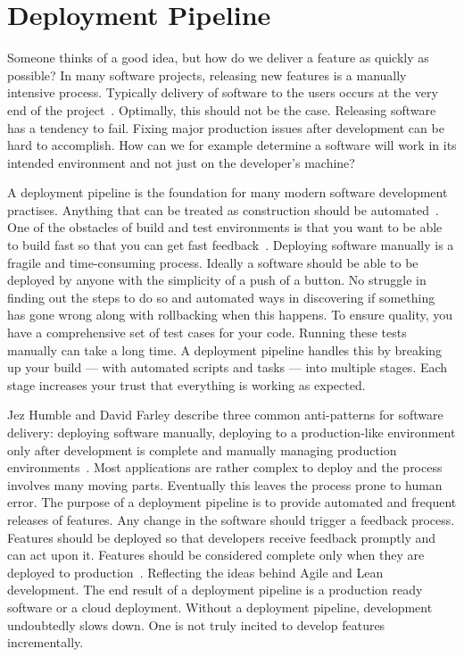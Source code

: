 \documentclass[english]{tktltiki2}
\begin{document}
\section{Deployment Pipeline}

Someone thinks of a good idea, but how do we deliver a feature as quickly as possible? In many software projects, releasing new features is a manually intensive process. Typically delivery of software to the users occurs at the very end of the project~\cite{HAB12}. Optimally, this should not be the case. Releasing software has a tendency to fail. Fixing major production issues after development can be hard to accomplish. How can we for example determine a software will work in its intended environment and not just on the developer’s machine?

A deployment pipeline is the foundation for many modern software development practises. Anything that can be treated as construction should be automated~\cite{Fow05}. One of the obstacles of build and test environments is that you want to be able to build fast so that you can get fast feedback~\cite{Fow13b}. Deploying software manually is a fragile and time-consuming process. Ideally a software should be able to be deployed by anyone with the simplicity of a push of a button. No struggle in finding out the steps to do so and automated ways in discovering if something has gone wrong along with rollbacking when this happens. To ensure quality, you have a comprehensive set of test cases for your code. Running these tests manually can take a long time. A deployment pipeline handles this by breaking up your build — with automated scripts and tasks — into multiple stages. Each stage increases your trust that everything is working as expected.

Jez Humble and David Farley describe three common anti-patterns for software delivery: deploying software manually, deploying to a production-like environment only after development is complete and manually managing production environments~\cite{HF11}. Most applications are rather complex to deploy and the process involves many moving parts. Eventually this leaves the process prone to human error. The purpose of a deployment pipeline is to provide automated and frequent releases of features. Any change in the software should trigger a feedback process. Features should be deployed so that developers receive feedback promptly and can act upon it. Features should be considered complete only when they are deployed to production~\cite{HF11}. Reflecting the ideas behind Agile and Lean development. The end result of a deployment pipeline is a production ready software or a cloud deployment. Without a deployment pipeline, development undoubtedly slows down. One is not truly incited to develop features incrementally.
\end{document}
